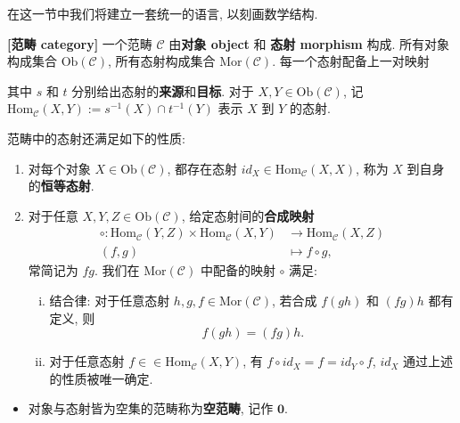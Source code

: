 \documentclass[UTF8]{book}
\begin{document}
在这一节中我们将建立一套统一的语言, 以刻画数学结构. 

\begin{definition}
    \textbf{[范畴 category]} 
    一个范畴 $\mathcal{C}$ 由\textbf{对象 object }和
    \textbf{态射 morphism }构成. 
    所有对象构成集合 $\mathrm{Ob}(\mathcal{C})$, 
    所有态射构成集合 $\mathrm{Mor}(\mathcal{C})$. 
    每一个态射配备上一对映射 
    其中 $s$ 和 $t$ 分别给出态射的\textbf{来源}和\textbf{目标}. 
    对于 $X,Y \in \mathrm{Ob}(\mathcal{C})$, 记 
    $\mathrm{Hom}_{\mathcal{C}}(X,Y):=s^{-1}(X)\cap t^{-1}(Y)$ 
    表示 $X$ 到 $Y$ 的态射. 
    
    范畴中的态射还满足如下的性质: 
    \begin{enumerate}[(1)]
        \item 对每个对象 $X \in \mathrm{Ob}(\mathcal{C})$, 
        都存在态射 $id_{X} \in \mathrm{Hom}_{\mathcal{C}}(X,X)$, 
        称为 $X$ 到自身的\textbf{恒等态射}. 
        \item 对于任意 $X,Y,Z \in \mathrm{Ob}(\mathcal{C})$, 
        给定态射间的\textbf{合成映射}
        $$ \begin{aligned}
            \circ: \mathrm{Hom}_{\mathcal{C}}(Y,Z) \times 
            \mathrm{Hom}_{\mathcal{C}}(X,Y) &\to 
            \mathrm{Hom}_{\mathcal{C}}(X,Z) \\
            (f,g) &\mapsto f \circ g,    
        \end{aligned}
        $$
        常简记为 $fg$. 我们在 $\mathrm{Mor}(\mathcal{C})$ 
        中配备的映射 $\circ$ 满足: 
        \begin{enumerate}[(i)]
            \item 结合律: 对于任意态射 $h,g,f \in \mathrm{Mor}(\mathcal{C})$, 
            若合成 $f(gh)$ 和 $(fg)h$ 都有定义, 则 
            $$ f(gh) = (fg)h. $$
            \item 对于任意态射 $f \in \in \mathrm{Hom}_{\mathcal{C}}(X,Y)$, 
            有 $f \circ id_{X} = f = id_{Y} \circ f$, 
            $id_X$ 通过上述的性质被唯一确定. 
        \end{enumerate}
    \end{enumerate}

    \begin{itemize}
        \item 对象与态射皆为空集的范畴称为\textbf{空范畴}, 记作 
        $\mathbf{0}$. 


\end{itemize}
\end{definition}
\end{document}
